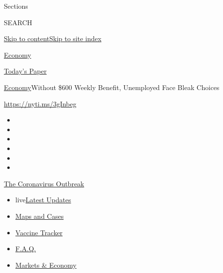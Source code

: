 Sections

SEARCH

\protect\hyperlink{site-content}{Skip to
content}\protect\hyperlink{site-index}{Skip to site index}

\href{https://www.nytimes.com/section/business/economy}{Economy}

\href{https://myaccount.nytimes.com/auth/login?response_type=cookie\&client_id=vi}{}

\href{https://www.nytimes.com/section/todayspaper}{Today's Paper}

\href{/section/business/economy}{Economy}\textbar{}Without \$600 Weekly
Benefit, Unemployed Face Bleak Choices

\href{https://nyti.ms/3gInbeg}{https://nyti.ms/3gInbeg}

\begin{itemize}
\item
\item
\item
\item
\item
\item
\end{itemize}

\href{https://www.nytimes.com/news-event/coronavirus?action=click\&pgtype=Article\&state=default\&region=TOP_BANNER\&context=storylines_menu}{The
Coronavirus Outbreak}

\begin{itemize}
\tightlist
\item
  live\href{https://www.nytimes.com/2020/08/08/world/coronavirus-updates.html?action=click\&pgtype=Article\&state=default\&region=TOP_BANNER\&context=storylines_menu}{Latest
  Updates}
\item
  \href{https://www.nytimes.com/interactive/2020/us/coronavirus-us-cases.html?action=click\&pgtype=Article\&state=default\&region=TOP_BANNER\&context=storylines_menu}{Maps
  and Cases}
\item
  \href{https://www.nytimes.com/interactive/2020/science/coronavirus-vaccine-tracker.html?action=click\&pgtype=Article\&state=default\&region=TOP_BANNER\&context=storylines_menu}{Vaccine
  Tracker}
\item
  \href{https://www.nytimes.com/interactive/2020/world/coronavirus-tips-advice.html?action=click\&pgtype=Article\&state=default\&region=TOP_BANNER\&context=storylines_menu}{F.A.Q.}
\item
  \href{https://www.nytimes.com/live/2020/08/07/business/stock-market-today-coronavirus?action=click\&pgtype=Article\&state=default\&region=TOP_BANNER\&context=storylines_menu}{Markets
  \& Economy}
\end{itemize}

